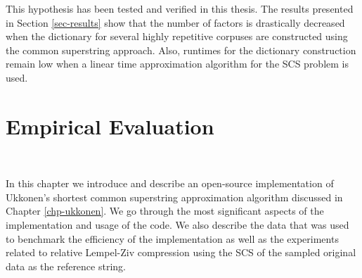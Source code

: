 \documentclass[english,twoside,censored,csm,algorithms-track-2020]{HYthesisML}
\theoremstyle{plain}
\theoremstyle{definition}
\begin{document}
This hypothesis has been tested and verified in this thesis. The results presented in Section
\ref{sec-results} show that the number of factors is drastically decreased when the dictionary
for several highly repetitive corpuses are constructed using the common superstring approach.
Also, runtimes for the dictionary construction remain low when a linear time approximation
algorithm for the SCS problem is used.
















\chapter{Empirical Evaluation}~\label{chp-results}

In this chapter we introduce and describe an open-source implementation of Ukkonen's shortest
common superstring
approximation algorithm discussed in Chapter \ref{chp-ukkonen}. We go through the most significant
aspects of the implementation and usage of the code. We also describe the data that was used to
benchmark the efficiency of the implementation as well as the experiments related to
relative Lempel-Ziv compression using the SCS of the sampled original data as the reference string.
\end{document}
